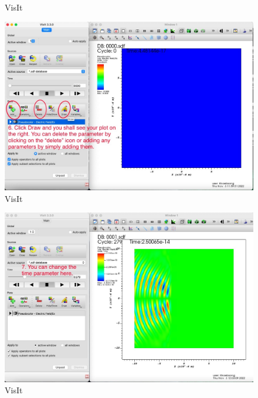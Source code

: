 \documentclass{article}
\begin{document}
\begin{enumerate}
\begin{figure}[htp]
        \caption{VisIt}
        \label{fig:my_label}
    \end{figure}
        \begin{figure}[htp]
        \centering
        \includegraphics[scale=0.3]{visit5.jpg}
        \caption{VisIt}
        \label{fig:my_label}
    \end{figure}
        \begin{figure}[htp]
        \centering
        \includegraphics[scale=0.3]{visit6.jpg}
        \caption{VisIt}
        \label{fig:my_label}
    \end{figure}
\end{enumerate}
\end{document}
